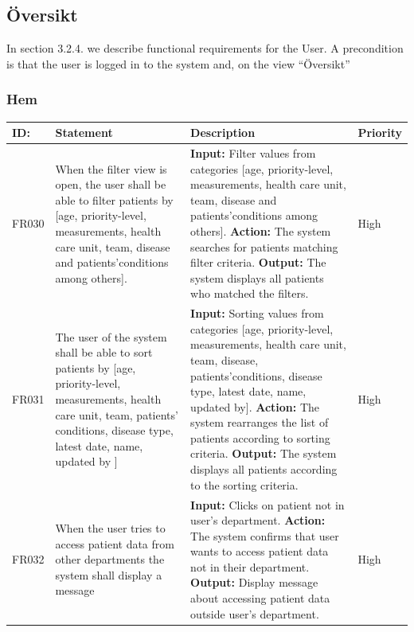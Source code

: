 \documentclass{scrreprt}
\begin{document}
\subsection{Översikt}
In section 3.2.4. we describe functional requirements for the User. A precondition is that the user is logged in to the system and, on the view “Översikt”
\subsubsection{Hem}
\begin{center}
\begin{tabularx}{\linewidth}{| l | X | X | l |}
\hline
\textbf{ID:} & \textbf{Statement} & \textbf{Description} & \textbf{Priority} \\ 
\hline
FR030 & When the filter view is open, the user shall be able to filter patients by [age, priority-level, measurements, health care unit, team, disease and patients’conditions among others].  & \textbf{Input:} Filter values from categories [age, priority-level, measurements, health care unit, team, disease and patients’conditions among others].
\newline \textbf{Action:} The system searches for patients matching filter criteria.
\newline \textbf{Output:} The system displays all patients who matched the filters. & High \\ 
\hline
FR031 & The user of the system shall be able to sort patients by [age, priority-level, measurements, health care unit, team, patients’ conditions, disease type, latest date, name, updated by ] & \textbf{Input:} Sorting values from categories [age, priority-level, measurements, health care unit, team, disease, patients’conditions, disease type, latest date, name, updated by].
\newline \textbf{Action:} The system rearranges the list of patients according to sorting criteria.
\newline \textbf{Output:} The system displays all patients according to the sorting criteria. & High \\ 
\hline
FR032 & When the user tries to access patient data from other departments the system shall display a message & \textbf{Input:} Clicks on patient not in user's department.
\newline \textbf{Action:} The system confirms that user wants to access patient data not in their department.
\newline \textbf{Output:} Display message about accessing patient data outside user's department. & High \\ 

\end{tabularx}
\end{center}
\end{document}

